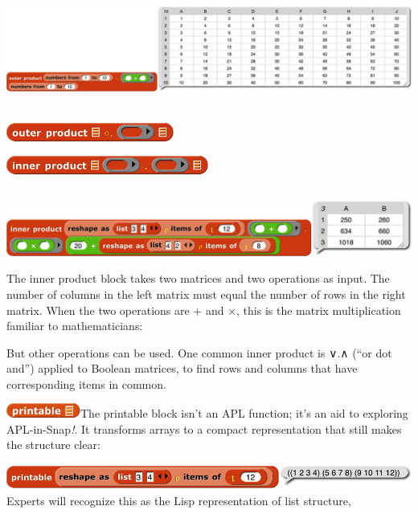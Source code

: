 \includegraphics[width=7.24in,height=1.52in]{media/image1335.png}

\includegraphics[width=2.16667in,height=0.24167in]{media/image1336.png}

\includegraphics[width=2.61667in,height=0.24167in]{media/image1337.png}

\includegraphics[width=7.33861in,height=1.00694in]{media/image1338.png}The
inner product block takes two matrices and two operations as input. The
number of columns in the left matrix must equal the number of rows in
the right matrix. When the two operations are + and ×, this is the
matrix multiplication familiar to mathematicians:

But other operations can be used. One common inner product is ∨.∧ (``or
dot and'') applied to Boolean matrices, to find rows and columns that
have corresponding items in common.

\includegraphics[width=0.95833in,height=0.18333in]{media/image1339.png}The
printable block isn't an APL function; it's an aid to exploring
APL-in-Snap\emph{!}. It transforms arrays to a compact representation
that still makes the structure clear:

\includegraphics[width=5.99792in,height=0.33333in]{media/image1340.png}Experts
will recognize this as the Lisp representation of list structure,

